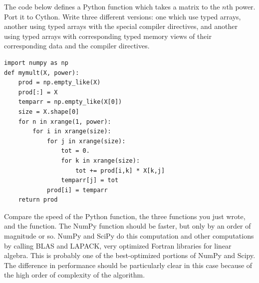 \begin{problem}
The code below defines a Python function which takes a matrix to the $n$th power.
Port it to Cython. Write three different versions: one which use typed arrays, another using typed arrays with the special compiler directives, and another using typed arrays with corresponding typed memory views of their corresponding data and the compiler directives.
\begin{lstlisting}
import numpy as np
def mymult(X, power):
    prod = np.empty_like(X)
    prod[:] = X
    temparr = np.empty_like(X[0])
    size = X.shape[0]
    for n in xrange(1, power):
        for i in xrange(size):
            for j in xrange(size):
                tot = 0.
                for k in xrange(size):
                    tot += prod[i,k] * X[k,j]
                temparr[j] = tot
            prod[i] = temparr
    return prod
\end{lstlisting}

Compare the speed of the Python function, the three functions you just wrote, and the  function.
The NumPy function should be faster, but only by an order of magnitude or so.
NumPy and SciPy do this computation and other computations by calling BLAS and LAPACK, very optimized Fortran libraries for linear algebra.
This is probably one of the best-optimized portions of NumPy and Scipy.
The difference in performance should be particularly clear in this case because of the high order of complexity of the algorithm.
\end{problem}

